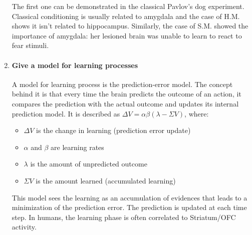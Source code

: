 \documentclass[12pt,article,oneside,a4paper]{memoir}
\begin{document}
\begin{enumerate}
The first one can be demonstrated in the classical Pavlov’s dog experiment.
Classical conditioning is usually related to amygdala and the case of H.M.
shows it isn’t related to hippocampus. Similarly, the case of S.M. showed the
importance of amygdala: her lesioned brain was unable to learn to react to fear
stimuli.

\item \paragraph{Give a model for learning processes}

A model for learning process is the prediction-error model. The concept behind
it is that every time the brain predicts the outcome of an action, it compares
the prediction with the actual outcome and updates its internal prediction
model. It is described as $\Delta V = \alpha \beta ( \lambda - \Sigma V)$,
where:
\begin{itemize}
\item $\Delta V$ is the change in learning (prediction error update)
\item $\alpha$ and $\beta$ are learning rates
\item $\lambda$ is the amount of unpredicted outcome
\item $\Sigma V$ is the amount learned (accumulated learning)
\end{itemize}

This model sees the learning as an accumulation of evidences that leads to a
minimization of the prediction error. The prediction is updated at each time
step. In humans, the learning phase is often correlated to Striatum/OFC
activity.

\end{enumerate}

\end{document}
